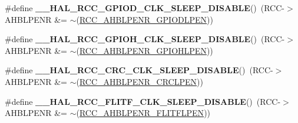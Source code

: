\begin{DoxyCompactItemize}
\item 
\hypertarget{group___r_c_c___peripheral___clock___sleep___enable___disable_ga8520028c77aa2ecdd497c313665fa381}{\#define {\bfseries \-\_\-\-\_\-\-H\-A\-L\-\_\-\-R\-C\-C\-\_\-\-G\-P\-I\-O\-D\-\_\-\-C\-L\-K\-\_\-\-S\-L\-E\-E\-P\-\_\-\-D\-I\-S\-A\-B\-L\-E}()~(R\-C\-C-\/$>$A\-H\-B\-L\-P\-E\-N\-R \&= $\sim$(\hyperlink{group___peripheral___registers___bits___definition_ga25cad84f367cbe2ecdbea5a5b3f0d605}{R\-C\-C\-\_\-\-A\-H\-B\-L\-P\-E\-N\-R\-\_\-\-G\-P\-I\-O\-D\-L\-P\-E\-N}))}\label{group___r_c_c___peripheral___clock___sleep___enable___disable_ga8520028c77aa2ecdd497c313665fa381}

\item 
\hypertarget{group___r_c_c___peripheral___clock___sleep___enable___disable_ga3150a9552cca2ec7e0f00d799fc52adb}{\#define {\bfseries \-\_\-\-\_\-\-H\-A\-L\-\_\-\-R\-C\-C\-\_\-\-G\-P\-I\-O\-H\-\_\-\-C\-L\-K\-\_\-\-S\-L\-E\-E\-P\-\_\-\-D\-I\-S\-A\-B\-L\-E}()~(R\-C\-C-\/$>$A\-H\-B\-L\-P\-E\-N\-R \&= $\sim$(\hyperlink{group___peripheral___registers___bits___definition_ga13b804e2e8ae7920a8db3a1828ff3b42}{R\-C\-C\-\_\-\-A\-H\-B\-L\-P\-E\-N\-R\-\_\-\-G\-P\-I\-O\-H\-L\-P\-E\-N}))}\label{group___r_c_c___peripheral___clock___sleep___enable___disable_ga3150a9552cca2ec7e0f00d799fc52adb}

\item 
\hypertarget{group___r_c_c___peripheral___clock___sleep___enable___disable_gaf63d9f5ce9a6922314054a94ee85eac0}{\#define {\bfseries \-\_\-\-\_\-\-H\-A\-L\-\_\-\-R\-C\-C\-\_\-\-C\-R\-C\-\_\-\-C\-L\-K\-\_\-\-S\-L\-E\-E\-P\-\_\-\-D\-I\-S\-A\-B\-L\-E}()~(R\-C\-C-\/$>$A\-H\-B\-L\-P\-E\-N\-R \&= $\sim$(\hyperlink{group___peripheral___registers___bits___definition_ga24b72821d1df0037ffad16d4e7aefc48}{R\-C\-C\-\_\-\-A\-H\-B\-L\-P\-E\-N\-R\-\_\-\-C\-R\-C\-L\-P\-E\-N}))}\label{group___r_c_c___peripheral___clock___sleep___enable___disable_gaf63d9f5ce9a6922314054a94ee85eac0}

\item 
\hypertarget{group___r_c_c___peripheral___clock___sleep___enable___disable_ga3d776af7d892a32ea3c68edf7891e4f5}{\#define {\bfseries \-\_\-\-\_\-\-H\-A\-L\-\_\-\-R\-C\-C\-\_\-\-F\-L\-I\-T\-F\-\_\-\-C\-L\-K\-\_\-\-S\-L\-E\-E\-P\-\_\-\-D\-I\-S\-A\-B\-L\-E}()~(R\-C\-C-\/$>$A\-H\-B\-L\-P\-E\-N\-R \&= $\sim$(\hyperlink{group___peripheral___registers___bits___definition_ga216c6dc7dadf00b88d1b0585b68e23f0}{R\-C\-C\-\_\-\-A\-H\-B\-L\-P\-E\-N\-R\-\_\-\-F\-L\-I\-T\-F\-L\-P\-E\-N}))}\label{group___r_c_c___peripheral___clock___sleep___enable___disable_ga3d776af7d892a32ea3c68edf7891e4f5}


\end{DoxyCompactItemize}
